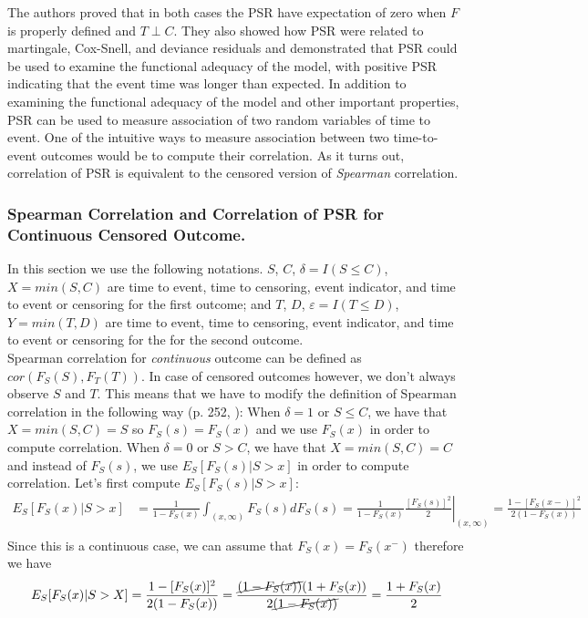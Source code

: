 \documentclass[]{article}
\let\epsilon\varepsilon
\begin{document}
The authors proved that in both cases the PSR have expectation of zero when $F$ is properly defined and $T \perp C$. They also showed how PSR were related to martingale, Cox-Snell, and deviance residuals and demonstrated that PSR could be used to examine the functional adequacy of the model, with positive PSR indicating that the event time was longer than expected. In addition to examining the functional adequacy of the model and other important properties, PSR can be used to measure association of two random variables of time to event. One of the intuitive ways to measure association between two time-to-event outcomes would be to compute their correlation. As it turns out, correlation of PSR is equivalent to the censored version of \emph{Spearman} correlation.

\subsubsection{Spearman Correlation and Correlation of PSR for Continuous Censored Outcome.}
In this section we use the following notations. $S$, $C$, $\delta=I(S\leq C)$, $X = min(S, C)$ are time to event, time to censoring, event indicator, and time to event or censoring for the first outcome; and $T$, $D$, $\epsilon=I(T\leq D)$, $Y = min(T, D)$ are time to event, time to censoring, event indicator, and time to event or censoring for the for the second outcome.\\
Spearman correlation for \emph{continuous} outcome can be defined as $cor(F_S(S), F_T(T))$. In case of censored outcomes however, we don't always observe $S$ and $T$. This means that we have to modify the definition of Spearman correlation in the following way (p. 252, \cite{dabrowska1986rank}): When $\delta = 1$ or $S\leq C$, we have that $X = min(S, C)=S$ so $F_S(s)=F_S(x)$ and we use $F_S(x)$ in order to compute correlation. When $\delta = 0$ or $S > C$, we have that $X = min(S, C)=C$ and instead of $F_S(s)$, we use $E_S[F_S(s)|S>x]$ in order to compute correlation. Let's first compute $E_S[F_S(s)|S>x]$:
	$$
	\begin{aligned}
		E_S[F_S(x)|S>x] &= \frac{1}{1-F_S(x)}\int_{(x, \infty)} F_S(s)dF_S(s) = \frac{1}{1-F_S(x)} \left.\frac{ [F_S(s)]^2}{2}\right|_{(x, \infty)} = \frac{1-[F_S(x-)]^2}{2(1-F_S(x))} \\
	\end{aligned}
	$$
Since this is a continuous case, we can assume that $F_S(x)=F_S(x^-)$ therefore we have
	$$
	\begin{aligned}
		E_S[F_S(x)|S>X] &=\frac{1-[F_S(x)]^2}{2(1-F_S(x))}=\frac{\cancel{(1-F_S(x))}(1+F_S(x))}{2\cancel{(1-F_S(x))}}  = \frac{1+F_S(x)}{2} \\
	\end{aligned}
	$$
\end{document}
